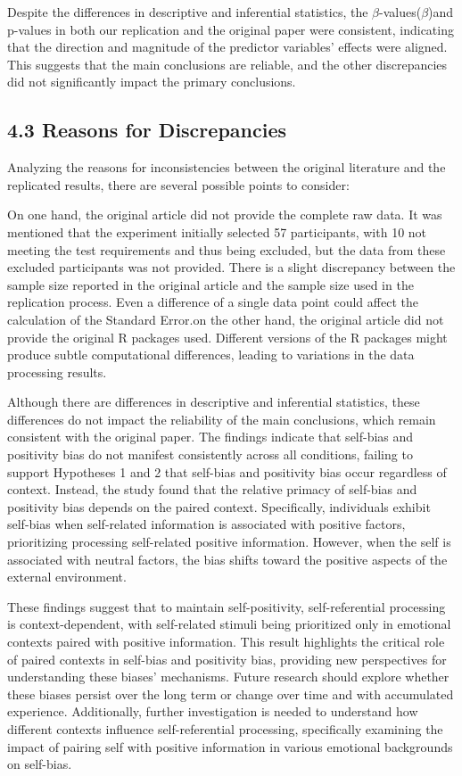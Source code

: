 \documentclass[
  man]{apa6}
\begin{document}
Despite the differences in descriptive and inferential statistics, the \(\beta\)-values(\(\beta\))and p-values in both our replication and the original paper were consistent, indicating that the direction and magnitude of the predictor variables' effects were aligned. This suggests that the main conclusions are reliable, and the other discrepancies did not significantly impact the primary conclusions.

\subsection{4.3 Reasons for Discrepancies}\label{reasons-for-discrepancies}

Analyzing the reasons for inconsistencies between the original literature and the replicated results, there are several possible points to consider:

On one hand, the original article did not provide the complete raw data. It was mentioned that the experiment initially selected 57 participants, with 10 not meeting the test requirements and thus being excluded, but the data from these excluded participants was not provided. There is a slight discrepancy between the sample size reported in the original article and the sample size used in the replication process. Even a difference of a single data point could affect the calculation of the Standard Error.on the other hand, the original article did not provide the original R packages used. Different versions of the R packages might produce subtle computational differences, leading to variations in the data processing results.

Although there are differences in descriptive and inferential statistics, these differences do not impact the reliability of the main conclusions, which remain consistent with the original paper. The findings indicate that self-bias and positivity bias do not manifest consistently across all conditions, failing to support Hypotheses 1 and 2 that self-bias and positivity bias occur regardless of context. Instead, the study found that the relative primacy of self-bias and positivity bias depends on the paired context. Specifically, individuals exhibit self-bias when self-related information is associated with positive factors, prioritizing processing self-related positive information. However, when the self is associated with neutral factors, the bias shifts toward the positive aspects of the external environment.

These findings suggest that to maintain self-positivity, self-referential processing is context-dependent, with self-related stimuli being prioritized only in emotional contexts paired with positive information. This result highlights the critical role of paired contexts in self-bias and positivity bias, providing new perspectives for understanding these biases' mechanisms. Future research should explore whether these biases persist over the long term or change over time and with accumulated experience. Additionally, further investigation is needed to understand how different contexts influence self-referential processing, specifically examining the impact of pairing self with positive information in various emotional backgrounds on self-bias.
\end{document}
